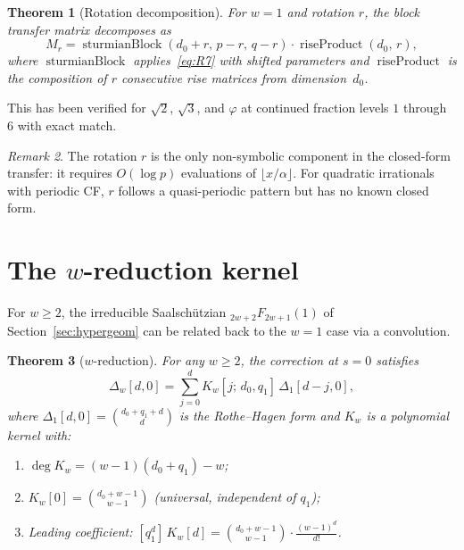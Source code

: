\documentclass[11pt]{article}
\newtheorem{theorem}{Theorem}[section]
\theoremstyle{definition}
\theoremstyle{remark}
\newtheorem{remark}[theorem]{Remark}
\newcommand{\floor}[1]{\lfloor #1 \rfloor}
\newcommand{\pFq}[2]{{}_{#1}F_{#2}}
\begin{document}
\begin{theorem}[Rotation decomposition]\label{thm:rotation}
For $w = 1$ and rotation $r$, the block transfer matrix decomposes
as
\begin{equation}\label{eq:rotation}
  M_r = \operatorname{sturmianBlock}(d_0 + r,\, p - r,\, q - r)
  \cdot \operatorname{riseProduct}(d_0,\, r),
\end{equation}
where $\operatorname{sturmianBlock}$ applies~\eqref{eq:R7} with
shifted parameters and $\operatorname{riseProduct}$ is the
composition of $r$ consecutive rise matrices from
dimension~$d_0$.
\end{theorem}

This has been verified for $\sqrt{2}$, $\sqrt{3}$, and $\varphi$
at continued fraction levels $1$ through~$6$ with exact match.

\begin{remark}
The rotation $r$ is the only non-symbolic component in the
closed-form transfer: it requires $O(\log p)$ evaluations of
$\floor{x/\alpha}$.
For quadratic irrationals with periodic CF, $r$ follows a
quasi-periodic pattern but has no known closed form.
\end{remark}

\section{The $w$-reduction kernel}\label{sec:wreduction}

For $w \geq 2$, the irreducible Saalsch\"utzian
$\pFq{2w+2}{2w+1}(1)$ of Section~\ref{sec:hypergeom} can be
related back to the $w = 1$ case via a convolution.

\begin{theorem}[$w$-reduction]\label{thm:wreduction}
For any $w \geq 2$, the correction at $s = 0$ satisfies
\begin{equation}\label{eq:convolution}
  \Delta_w[d, 0] = \sum_{j=0}^{d} K_w[j;\, d_0, q_1]\,
  \Delta_1[d - j, 0],
\end{equation}
where $\Delta_1[d, 0] = \binom{d_0 + q_1 + d}{d}$ is the
Rothe--Hagen form and $K_w$ is a polynomial kernel with:
\begin{enumerate}
\item $\deg K_w = (w-1)(d_0 + q_1) - w$;
\item $K_w[0] = \binom{d_0 + w - 1}{w - 1}$ (universal, independent of $q_1$);
\item Leading coefficient: $[q_1^d]\, K_w[d]
  = \binom{d_0 + w - 1}{w - 1}\cdot\frac{(w-1)^d}{d!}$.
\end{enumerate}
\end{theorem}
\end{document}
